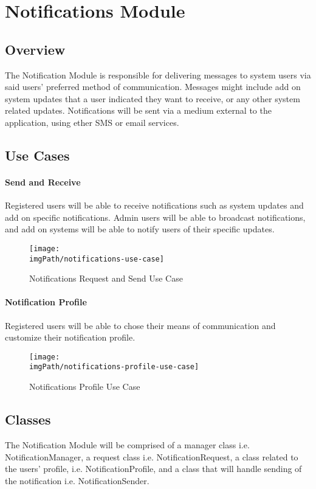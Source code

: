 \section{Notifications Module}

\subsection{Overview}
The Notification Module is responsible for delivering  messages to system users via said users' preferred method of communication. Messages might include add on system updates that a user indicated they want to receive, or any other system related updates. Notifications will be sent via a medium external to the application, using ether SMS or email services.

\subsection{Use Cases}
\paragraph{Send and Receive}
Registered users will be able to receive notifications such as system updates and add on specific notifications. Admin users will be able to broadcast notifications, and add on systems will be able to notify users of their specific updates.
\begin{figure}[H]
\centering
\texttt{[image: \\imgPath/notifications-use-case]}
\caption{Notifications Request and Send Use Case}
\end{figure}

\paragraph{Notification Profile}
Registered users will be able to chose their means of communication and customize their notification profile.
\begin{figure}[H]
\centering
\texttt{[image: \\imgPath/notifications-profile-use-case]}
\caption{Notifications Profile Use Case}
\end{figure}

\subsection{Classes}
The Notification Module will be comprised of a manager class i.e. NotificationManager, a request class i.e. NotificationRequest, a class related to the users' profile, i.e. NotificationProfile, and a class that will handle sending of the notification i.e. NotificationSender.

